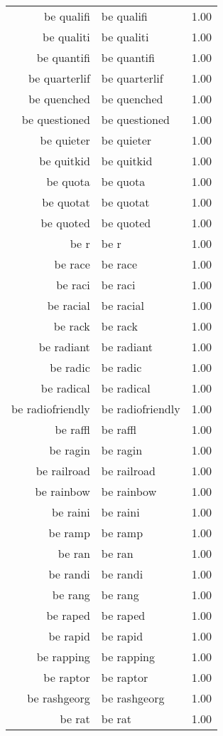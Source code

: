 \begin{table}[ht]
\begin{tabular}{rlr}
  be qualifi & be qualifi & 1.00 \\ 
  be qualiti & be qualiti & 1.00 \\ 
  be quantifi & be quantifi & 1.00 \\ 
  be quarterlif & be quarterlif & 1.00 \\ 
  be quenched & be quenched & 1.00 \\ 
  be questioned & be questioned & 1.00 \\ 
  be quieter & be quieter & 1.00 \\ 
  be quitkid & be quitkid & 1.00 \\ 
  be quota & be quota & 1.00 \\ 
  be quotat & be quotat & 1.00 \\ 
  be quoted & be quoted & 1.00 \\ 
  be r & be r & 1.00 \\ 
  be race & be race & 1.00 \\ 
  be raci & be raci & 1.00 \\ 
  be racial & be racial & 1.00 \\ 
  be rack & be rack & 1.00 \\ 
  be radiant & be radiant & 1.00 \\ 
  be radic & be radic & 1.00 \\ 
  be radical & be radical & 1.00 \\ 
  be radiofriendly & be radiofriendly & 1.00 \\ 
  be raffl & be raffl & 1.00 \\ 
  be ragin & be ragin & 1.00 \\ 
  be railroad & be railroad & 1.00 \\ 
  be rainbow & be rainbow & 1.00 \\ 
  be raini & be raini & 1.00 \\ 
  be ramp & be ramp & 1.00 \\ 
  be ran & be ran & 1.00 \\ 
  be randi & be randi & 1.00 \\ 
  be rang & be rang & 1.00 \\ 
  be raped & be raped & 1.00 \\ 
  be rapid & be rapid & 1.00 \\ 
  be rapping & be rapping & 1.00 \\ 
  be raptor & be raptor & 1.00 \\ 
  be rashgeorg & be rashgeorg & 1.00 \\ 
  be rat & be rat & 1.00 \\ 

\end{tabular}
\end{table}
